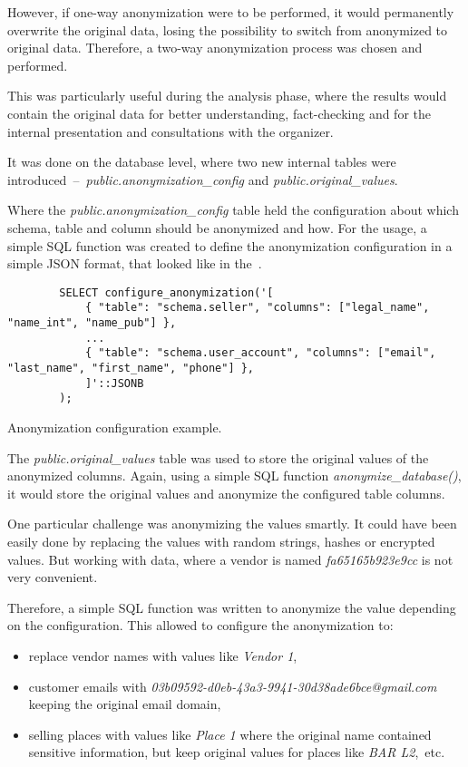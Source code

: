 However, if one-way anonymization were to be performed, it would permanently overwrite the original data, losing the possibility to switch from anonymized to original data.
Therefore, a two-way anonymization process was chosen and performed.

This was particularly useful during the analysis phase, where the results would contain the original data for better understanding, fact-checking and for the internal presentation and consultations with the organizer.

It was done on the database level, where two new internal tables were introduced~–~\textit{public.anonymization\_config} and \textit{public.original\_values}.

Where the \textit{public.anonymization\_config} table held the configuration about which schema, table and column should be anonymized and how.
For the usage, a simple SQL function was created to define the anonymization configuration in a simple JSON format, that looked like in the~.

\begin{listing}[H]
	\begin{verbatim}
		SELECT configure_anonymization('[
			{ "table": "schema.seller", "columns": ["legal_name", "name_int", "name_pub"] },
			...
			{ "table": "schema.user_account", "columns": ["email", "last_name", "first_name", "phone"] },
			]'::JSONB
		);
	\end{verbatim}
	\caption{Anonymization configuration example.}
	\label{lst:anonymization-configuration}
\end{listing}

The \textit{public.original\_values} table was used to store the original values of the anonymized columns.
Again, using a simple SQL function \textit{anonymize\_database()}, it would store the original values and anonymize the configured table columns.

One particular challenge was anonymizing the values smartly.
It could have been easily done by replacing the values with random strings, hashes or encrypted values.
But working with data, where a vendor is named \textit{fa65165b923e9cc} is not very convenient.

Therefore, a simple SQL function was written to anonymize the value depending on the configuration.
This allowed to configure the anonymization to:
\begin{itemize}
	\item replace vendor names with values like \textit{Vendor 1},
	\item customer emails with \textit{03b09592-d0eb-43a3-9941-30d38ade6bce@gmail.com} keeping the original email domain,
	\item selling places with values like \textit{Place 1} where the original name contained sensitive information, but keep original values for places like \textit{BAR L2},~etc.
\end{itemize}

